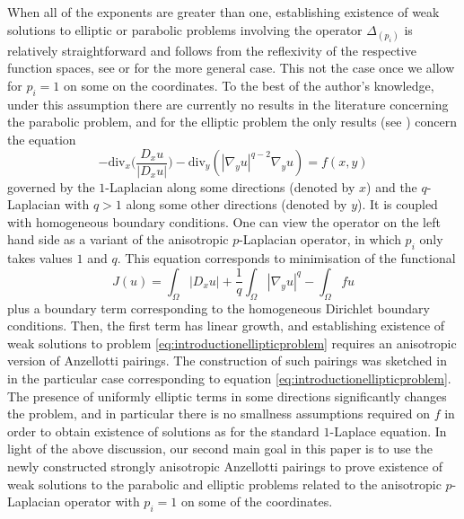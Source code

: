 \documentclass[reqno,12pt]{amsart}
\numberwithin{equation}{section}
\begin{document}
When all of the exponents are greater than one, establishing existence of weak solutions to elliptic or parabolic problems involving the operator $\Delta_{(p_i)}$ is relatively straightforward and follows from the reflexivity of the respective function spaces, see \cite{BGM,FVV} or \cite{AC} for the more general case. This not the case once we allow for $p_i = 1$ on some on the coordinates. To the best of the author's knowledge, under this assumption there are currently no results in the literature concerning the parabolic problem, and for the elliptic problem the only results (see \cite{MRST}) concern the equation
\begin{equation}\label{eq:introductionellipticproblem}
-\mathrm{div}_x \bigg( \frac{D_x u}{|D_x u|} \bigg) - \mathrm{div}_y (|\nabla_y u|^{q-2} \nabla_y u) = f(x,y)
\end{equation}
governed by the $1$-Laplacian along some directions (denoted by $x$) and the $q$-Laplacian with $q > 1$ along some other directions (denoted by $y$). It is coupled with homogeneous boundary conditions. One can view the operator on the left hand side as a variant of the anisotropic $p$-Laplacian operator, in which $p_i$ only takes values $1$ and $q$. This equation corresponds to minimisation of the functional
\begin{equation}
J(u) = \int_{\Omega} |D_x u| + \frac1q \int_\Omega |\nabla_y u|^q - \int_\Omega fu
\end{equation}
plus a boundary term corresponding to the homogeneous Dirichlet boundary conditions. Then, the first term has linear growth, and establishing existence of weak solutions to problem \eqref{eq:introductionellipticproblem} requires an anisotropic version of Anzellotti pairings. The construction of such pairings was sketched in \cite{MRST} in the particular case corresponding to equation \eqref{eq:introductionellipticproblem}. The presence of uniformly elliptic terms in some directions significantly changes the problem, and in particular there is no smallness assumptions required on $f$ in order to obtain existence of solutions as for the standard $1$-Laplace equation. In light of the above discussion, our second main goal in this paper is to use the newly constructed strongly anisotropic Anzellotti pairings to prove existence of weak solutions to the parabolic and elliptic problems related to the anisotropic $p$-Laplacian operator with $p_i = 1$ on some of the coordinates.
\end{document}
